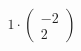 \documentclass[preview]{standalone}
\begin{document}
\begin{align*}
1\cdot\begin{pmatrix}-2 \\ 2\end{pmatrix}
\end{align*}
\end{document}
